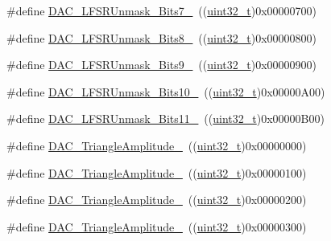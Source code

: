 \begin{DoxyCompactItemize}
\item 
\#define \hyperlink{group___d_a_c__lfsrunmask__triangleamplitude_gaf0a93c1ee1e13776fae7558b36243431}{D\+A\+C\+\_\+\+L\+F\+S\+R\+Unmask\+\_\+\+Bits7\+\_}~((\hyperlink{_p_e___types_8h_a33594304e786b158f3fb30289278f5af}{uint32\+\_\+t})0x00000700)
\item 
\#define \hyperlink{group___d_a_c__lfsrunmask__triangleamplitude_ga4f56965841d9d91ca5b6de43ee589598}{D\+A\+C\+\_\+\+L\+F\+S\+R\+Unmask\+\_\+\+Bits8\+\_}~((\hyperlink{_p_e___types_8h_a33594304e786b158f3fb30289278f5af}{uint32\+\_\+t})0x00000800)
\item 
\#define \hyperlink{group___d_a_c__lfsrunmask__triangleamplitude_gaf7f4540d9ec6efe074e1e4485f9a347a}{D\+A\+C\+\_\+\+L\+F\+S\+R\+Unmask\+\_\+\+Bits9\+\_}~((\hyperlink{_p_e___types_8h_a33594304e786b158f3fb30289278f5af}{uint32\+\_\+t})0x00000900)
\item 
\#define \hyperlink{group___d_a_c__lfsrunmask__triangleamplitude_ga7670f0e10f062571d0e56027ef653228}{D\+A\+C\+\_\+\+L\+F\+S\+R\+Unmask\+\_\+\+Bits10\+\_}~((\hyperlink{_p_e___types_8h_a33594304e786b158f3fb30289278f5af}{uint32\+\_\+t})0x00000\+A00)
\item 
\#define \hyperlink{group___d_a_c__lfsrunmask__triangleamplitude_gaeb9b5992b771f9a14587eeda58227831}{D\+A\+C\+\_\+\+L\+F\+S\+R\+Unmask\+\_\+\+Bits11\+\_}~((\hyperlink{_p_e___types_8h_a33594304e786b158f3fb30289278f5af}{uint32\+\_\+t})0x00000\+B00)
\item 
\#define \hyperlink{group___d_a_c__lfsrunmask__triangleamplitude_ga49b1eddf4e6371b4be8751162dc94ac4}{D\+A\+C\+\_\+\+Triangle\+Amplitude\+\_}~((\hyperlink{_p_e___types_8h_a33594304e786b158f3fb30289278f5af}{uint32\+\_\+t})0x00000000)
\item 
\#define \hyperlink{group___d_a_c__lfsrunmask__triangleamplitude_ga9798d68c3bbf0a57306bf2f962697377}{D\+A\+C\+\_\+\+Triangle\+Amplitude\+\_}~((\hyperlink{_p_e___types_8h_a33594304e786b158f3fb30289278f5af}{uint32\+\_\+t})0x00000100)
\item 
\#define \hyperlink{group___d_a_c__lfsrunmask__triangleamplitude_gad3f31de1277836df1109576a53c47e87}{D\+A\+C\+\_\+\+Triangle\+Amplitude\+\_}~((\hyperlink{_p_e___types_8h_a33594304e786b158f3fb30289278f5af}{uint32\+\_\+t})0x00000200)
\item 
\#define \hyperlink{group___d_a_c__lfsrunmask__triangleamplitude_ga42653712ce783d33ecb2f3e97e9c2ece}{D\+A\+C\+\_\+\+Triangle\+Amplitude\+\_}~((\hyperlink{_p_e___types_8h_a33594304e786b158f3fb30289278f5af}{uint32\+\_\+t})0x00000300)

\end{DoxyCompactItemize}
